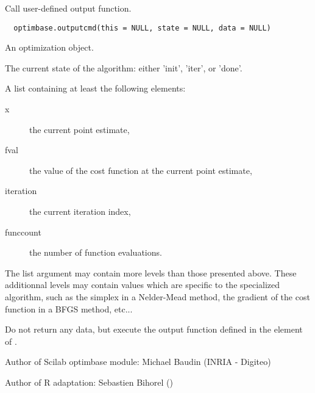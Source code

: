 %
\begin{Description}\relax
Call user-defined output function.
\end{Description}
%
\begin{Usage}
\begin{verbatim}
  optimbase.outputcmd(this = NULL, state = NULL, data = NULL)
\end{verbatim}
\end{Usage}
%
\begin{Arguments}
\begin{ldescription}
\item[\code{this}] An optimization object.
\item[\code{state}] The current state of the algorithm: either 'init', 'iter', or
'done'.
\item[\code{data}] A list containing at least the following elements:
\begin{description}

\item[x] the current point estimate,
\item[fval] the value of the cost function at the current point
estimate,
\item[iteration] the current iteration index,
\item[funccount] the number of function evaluations.

\end{description}


\end{ldescription}
\end{Arguments}
%
\begin{Details}\relax
The  list argument may contain more levels than those presented
above. These additionnal levels may contain values which are specific to the
specialized algorithm, such as the simplex in a Nelder-Mead method, the
gradient of the cost function in a BFGS method, etc...
\end{Details}
%
\begin{Value}
Do not return any data, but execute the output function defined in the
 element of .
\end{Value}
%
\begin{Author}\relax
Author of Scilab optimbase module: Michael Baudin (INRIA - Digiteo)

Author of R adaptation: Sebastien Bihorel ()
\end{Author}
